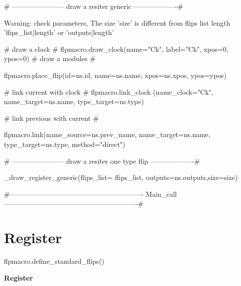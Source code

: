 {%
{%
{# -----------------------
 draw a resiter generic
-------------------#}
{%

{%
 Warning: check parameters, The size '{{size}}' is different from flips list length '{{flips_list|length}}' or
 '{{outputs|length}}'
{%
    {# draw a clock #}
    {{ flpmacro.draw_clock(name="Ck", label="Ck", xpos=0, ypos=0)}}
    {# draw a modules #}
    {%
    {%
    {%
        {%
        {%
        {%
        {%
        {{ flpmacro.place_flip(id=ns.id, name=ns.name, xpos=ns.xpos, ypos=ypos)}}

        {# link current with clock #}
        {{ flpmacro.link_clock (name_clock="Ck", name_target=ns.name, type_target=ns.type)}}

        {# link previous with current #}
        {%
            {{ flpmacro.link(name_source=ns.prev_name, name_target=ns.name, type_target=ns.type, method="direct")}}
        {%
        {%
        {%
    {%

{%
{%


{# -----------------------
 draw a resiter one type flip
-------------------#}
{%
{%
{%
{%
    {%
{%
{{ _draw_register_generic(flips_list= flips_list, outputs=ns.outputs,size=size)}}

{%

{#----------------------------------------------------------
 Main_call
----------------------------------------------------------#}
\section{Register}

{{flpmacro.define_standard_flips()}}

{%
 \textbf{Register}

}}}}}}}}}}}}}}}}}}}}}}}}}}}
